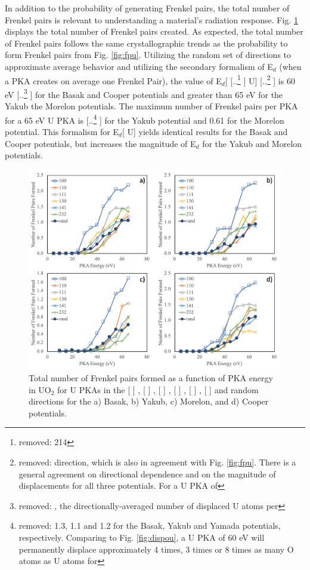 \documentclass[review]{elsarticle} %
\providecommand{\DIFaddtex}[1]{{\protect\color{blue} \sf #1}} %
\providecommand{\DIFdeltex}[1]{{\protect\color{red} [..\footnote{removed: #1} ]}} %
\providecommand{\DIFaddbegin}{} %
\providecommand{\DIFaddend}{} %
\providecommand{\DIFdelbegin}{} %
\providecommand{\DIFdelend}{} %
\providecommand{\DIFaddFL}[1]{\DIFadd{#1}} %
\providecommand{\DIFadd}[1]{\texorpdfstring{\DIFaddtex{#1}}{#1}} %
\providecommand{\DIFdel}[1]{\texorpdfstring{\DIFdeltex{#1}}{}} %
\newcommand{\DIFscaledelfig}{0.5}
\newlength{\DIFdelgraphicswidth} %
\newlength{\DIFdelgraphicsheight} %
\newcommand{\DIFaddincludegraphics}[2][]{{\color{blue}\fbox{\DIFOincludegraphics[#1]{#2}}}} %
\newcommand{\DIFdelincludegraphics}[2][]{%
\sbox{\DIFdelgraphicsbox}{\DIFOincludegraphics[#1]{#2}}%
\settoboxwidth{\DIFdelgraphicswidth}{\DIFdelgraphicsbox} %
\settoboxtotalheight{\DIFdelgraphicsheight}{\DIFdelgraphicsbox} %
\scalebox{\DIFscaledelfig}{%
\parbox[b]{\DIFdelgraphicswidth}{\usebox{\DIFdelgraphicsbox}\\[-\baselineskip] \rule{\DIFdelgraphicswidth}{0em}}\llap{\resizebox{\DIFdelgraphicswidth}{\DIFdelgraphicsheight}{%
\setlength{\unitlength}{\DIFdelgraphicswidth}%
\begin{picture}(1,1)%
\thicklines\linethickness{2pt} %
{\color[rgb]{1,0,0}\put(0,0){\framebox(1,1){}}}%
{\color[rgb]{1,0,0}\put(0,0){\line( 1,1){1}}}%
{\color[rgb]{1,0,0}\put(0,1){\line(1,-1){1}}}%
\end{picture}%
}\hspace*{3pt}}} %
} %
\DeclareRobustCommand{\DIFaddbegin}{\DIFOaddbegin \let\includegraphics\DIFaddincludegraphics} %
\DeclareRobustCommand{\DIFaddend}{\DIFOaddend \let\includegraphics\DIFOincludegraphics} %
\DeclareRobustCommand{\DIFdelbegin}{\DIFOdelbegin \let\includegraphics\DIFdelincludegraphics} %
\DeclareRobustCommand{\DIFdelend}{\DIFOaddend \let\includegraphics\DIFOincludegraphics} %
\begin{document}
\DIFadd{In addition to the probability of generating Frenkel pairs, the total number of Frenkel pairs is relevant to understanding a material's radiation response. Fig. \ref{fig:fpun} displays the total number of Frenkel pairs created. As expected, the total number of Frenkel pairs follows the same crystallographic trends as the probability to form Frenkel pairs from Fig. \ref{fig:fpu}. Utilizing the random set of directions to approximate average behavior and utilizing the secondary formalism of E$_d$ (when a PKA creates on average one Frenkel Pair), the value of E$_d$}\DIFaddend [\DIFdelbegin \DIFdel{214}\DIFdelend \DIFaddbegin \DIFadd{U}\DIFaddend ] \DIFdelbegin \DIFdel{direction, which is also in agreement with Fig. \ref{fig:fpu}. There is a general agreement on directional dependence and on the magnitude of displacements for all three potentials. For a U PKA of }\DIFdelend \DIFaddbegin \DIFadd{is }\DIFaddend 60 eV \DIFdelbegin \DIFdel{, the directionally-averaged number of displaced U atoms per }\DIFdelend \DIFaddbegin \DIFadd{for the Basak and Cooper potentials and greater than 65 eV for the Yakub the Morelon potentials. The maximum number of Frenkel pairs per PKA for a 65 eV }\DIFaddend U PKA is \DIFdelbegin \DIFdel{1.3, 1.1 and 1.2 for the Basak, Yakub and Yamada potentials, respectively.
Comparing to Fig. \ref{fig:dispou}, a U PKA of 60 eV will permanently displace approximately 4 times, 3 times or 8 times as many O atoms as U atoms for }\DIFdelend \DIFaddbegin \DIFadd{0.94 for the Yakub potential and 0.61 for the Morelon potential. This formalism for E$_d$}[\DIFadd{U}] \DIFadd{yields identical results for the Basak and Cooper potentials, but increases the magnitude of E$_d$ for the Yakub and Morelon potentials.
}

\begin{figure}[h]
 \centering
 \includegraphics[width=1.0\textwidth]{FP_UN.png}
 \caption{\DIFaddFL{Total number of Frenkel pairs formed as a function of PKA energy in UO$_2$ for U PKAs in the }[\DIFaddFL{100}]\DIFaddFL{, }[\DIFaddFL{110}]\DIFaddFL{, }[\DIFaddFL{111}]\DIFaddFL{, }[\DIFaddFL{130}]\DIFaddFL{, }[\DIFaddFL{141}]\DIFaddFL{, }[\DIFaddFL{232}] \DIFaddFL{and random directions for the a) Basak, b) Yakub, c) Morelon, and d) Cooper potentials. }}
 \label{fig:fpun}
\end{figure}
\end{document}
